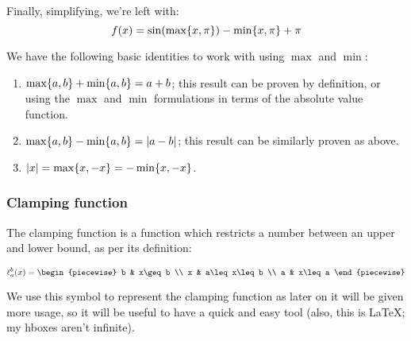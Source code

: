 \begin{example}
    Finally, simplifying, we're left with:
    $$
        f(x) = \sin(\max\{x,\pi\})-\min\{x,\pi\}+\pi
    $$
\end{example}

\begin{theorem}
    We have the following basic identities to work with using $\max$ and $\min$:
    \begin{enumerate}
        \item $\max\{a,b\}+\min\{a,b\}=a+b$; this result can be proven by definition, or using the $\max$ and $\min$ formulations in terms of the absolute value function.
        \item $\max\{a,b\}-\min\{a,b\}=\abs{a-b}$; this result can be similarly proven as above.
        \item $\abs{x}=\max\{x,-x\}=-\min\{x,-x\}$.
    \end{enumerate}
\end{theorem}

\subsubsection{Clamping function}
The clamping function is a function which restricts a number between an upper and lower bound, as per its definition:

$$
\ell_{a}^{b}(x)=\begin{piecewise}
    b & x\geq b \\
    x & a\leq x\leq b \\
    a & x\leq a
\end{piecewise}
$$

We use this symbol to represent the clamping function as later on it will be given more usage, so it will be useful to have a quick and easy tool (also, this is LaTeX; my hboxes aren't infinite).

